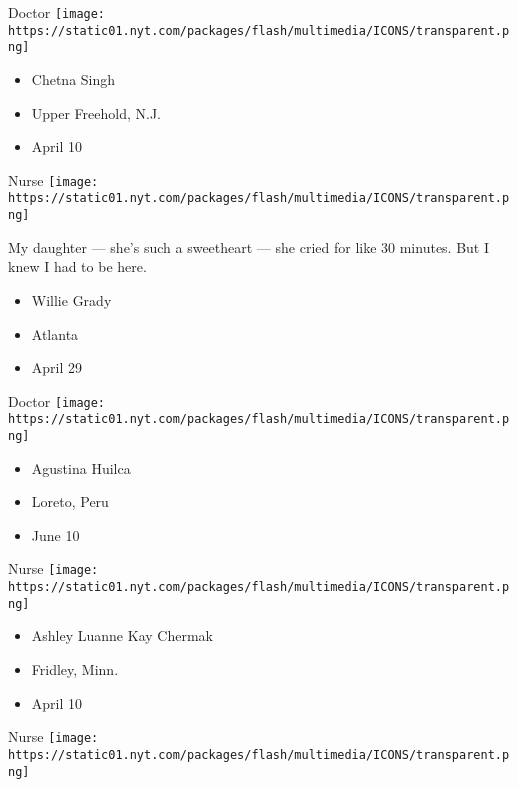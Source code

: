 \protect\hyperlink{item-chetna-singh}{}

Doctor
\texttt{[image: https://static01.nyt.com/packages/flash/multimedia/ICONS/transparent.png]}

\begin{itemize}
\tightlist
\item
  Chetna Singh
\item
  Upper Freehold, N.J.
\item
  April 10
\end{itemize}

\protect\hyperlink{item-willie-grady}{}

Nurse
\texttt{[image: https://static01.nyt.com/packages/flash/multimedia/ICONS/transparent.png]}

My daughter --- she's such a sweetheart --- she cried for like 30
minutes. But I knew I had to be here.

\begin{itemize}
\tightlist
\item
  Willie Grady
\item
  Atlanta
\item
  April 29
\end{itemize}

\protect\hyperlink{item-agustina-huilca}{}

Doctor
\texttt{[image: https://static01.nyt.com/packages/flash/multimedia/ICONS/transparent.png]}

\begin{itemize}
\tightlist
\item
  Agustina Huilca
\item
  Loreto, Peru
\item
  June 10
\end{itemize}

\protect\hyperlink{item-ashley-luanne-kay-chermak}{}

Nurse
\texttt{[image: https://static01.nyt.com/packages/flash/multimedia/ICONS/transparent.png]}

\begin{itemize}
\tightlist
\item
  Ashley Luanne Kay Chermak
\item
  Fridley, Minn.
\item
  April 10
\end{itemize}

\protect\hyperlink{item-patricia-tiu}{}

Nurse
\texttt{[image: https://static01.nyt.com/packages/flash/multimedia/ICONS/transparent.png]}

